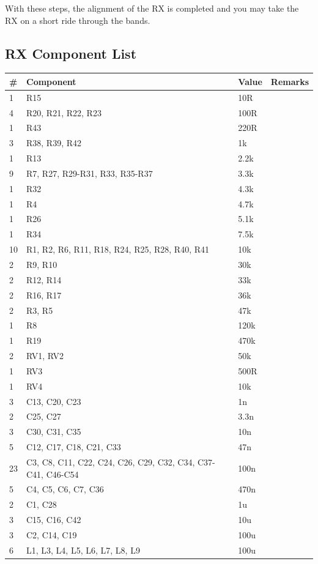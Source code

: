 \documentclass[10pt, a4paper,twoside]{scrartcl}
\begin{document}
With these steps, the alignment of the RX is completed and you may take the RX on a short ride through the bands.

\clearpage
\subsection{RX Component List}  \label{sec:rxcomp}
\begin{longtable}{|l|p{6cm}|l|l|} \hline 
\# & Component & Value & Remarks \\ \hline 
1 & R15 & 10R & \\
4 & R20, R21, R22, R23 & 100R & \\
1 & R43 & 220R & \\
3 & R38, R39, R42 & 1k & \\
1 & R13 & 2.2k & \\
9 & R7, R27, R29-R31, R33, R35-R37 & 3.3k & \\
1 & R32 & 4.3k & \\
1 & R4 & 4.7k & \\
1 & R26 & 5.1k & \\
1 & R34 & 7.5k & \\
10 & R1, R2, R6, R11, R18, R24, R25, R28, R40, R41 & 10k & \\
2 & R9, R10 & 30k & \\
2 & R12, R14 & 33k & \\
2 & R16, R17 & 36k & \\
2 & R3, R5 & 47k & \\
1 & R8 & 120k & \\
1 & R19 & 470k & \\
2 & RV1, RV2 & 50k & \\
1 & RV3 & 500R & \\
1 & RV4 & 10k & \\
3 & C13, C20, C23 & 1n & \\
2 & C25, C27 & 3.3n & \\
3 & C30, C31, C35 & 10n & \\
5 & C12, C17, C18, C21, C33 & 47n & \\
23 & C3, C8, C11, C22, C24, C26, C29, C32, C34, C37-C41, C46-C54 & 100n & \\
5 & C4, C5, C6, C7, C36 & 470n & \\
2 & C1, C28 & 1u & \\
3 & C15, C16, C42 & 10u & \\
3 & C2, C14, C19 & 100u & \\
6 & L1, L3, L4, L5, L6, L7, L8, L9 & 100u & \\

\end{longtable}
\end{document}
